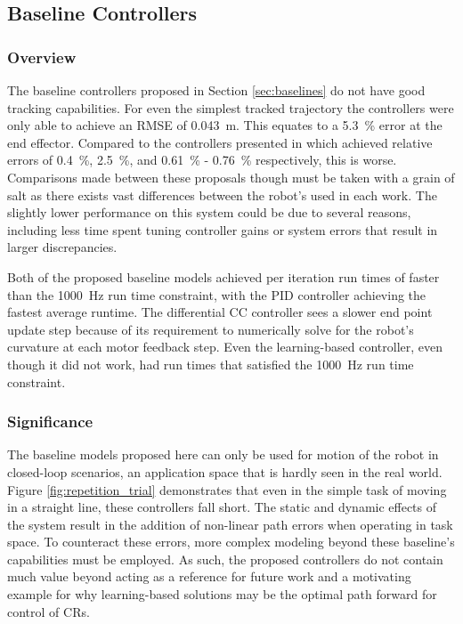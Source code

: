 \subsection{Baseline Controllers}
\subsubsection{Overview}
The baseline controllers proposed in Section \ref{sec:baselines} do not have good tracking capabilities. For even the simplest tracked trajectory the controllers were only able to achieve an RMSE of \SI{0.043}{m}. This equates to a \SI{5.3}{\%} error at the end effector. Compared to the controllers presented in \cite{grassmann2022a, 7112506, 8115276} which achieved relative errors of \SI{0.4}{\%}, \SI{2.5}{\%}, and \SI{0.61}{\%} - \SI{0.76}{\%} respectively, this is worse. Comparisons made between these proposals though must be taken with a grain of salt as there exists vast differences between the robot's used in each work. The slightly lower performance on this system could be due to several reasons, including less time spent tuning controller gains or system errors that result in larger discrepancies. 

Both of the proposed baseline models achieved per iteration run times of faster than the \SI{1000}{Hz} run time constraint, with the PID controller achieving the fastest average runtime. The differential CC controller sees a slower end point update step because of its requirement to numerically solve for the robot's curvature at each motor feedback step. Even the learning-based controller, even though it did not work, had run times that satisfied the \SI{1000}{Hz} run time constraint. 

\subsubsection{Significance}
The baseline models proposed here can only be used for motion of the robot in closed-loop scenarios, an application space that is hardly seen in the real world. Figure \ref{fig:repetition_trial} demonstrates that even in the simple task of moving in a straight line, these controllers fall short. The static and dynamic effects of the system result in the addition of non-linear path errors when operating in task space. To counteract these errors, more complex modeling beyond these baseline's capabilities must be employed. As such, the proposed controllers do not contain much value beyond acting as a reference for future work and a motivating example for why learning-based solutions may be the optimal path forward for control of CRs. 

